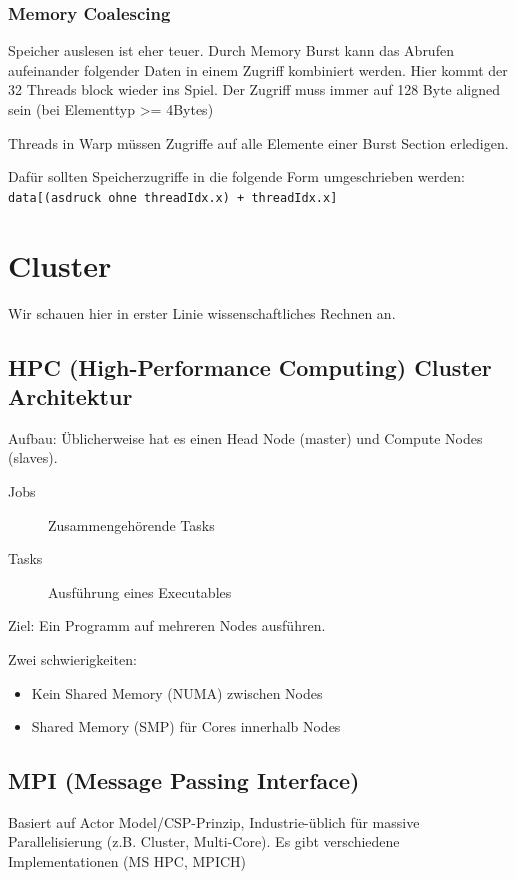 \subsubsection{Memory Coalescing}

Speicher auslesen ist eher teuer. Durch Memory Burst kann das Abrufen aufeinander folgender Daten in einem Zugriff kombiniert werden. Hier kommt der 32 Threads block wieder ins Spiel. Der Zugriff muss immer auf 128 Byte aligned sein (bei Elementtyp >= 4Bytes)

Threads in Warp müssen Zugriffe auf alle Elemente einer Burst Section erledigen.

Dafür sollten Speicherzugriffe in die folgende Form umgeschrieben werden: \lstinline|data[(asdruck ohne threadIdx.x) + threadIdx.x]|



\section{Cluster}

Wir schauen hier in erster Linie wissenschaftliches Rechnen an.

\subsection{HPC (High-Performance Computing) Cluster Architektur}

Aufbau: Üblicherweise hat es einen Head Node (master) und Compute Nodes (slaves).

\begin{description}
	\item[Jobs] Zusammengehörende Tasks
	\item[Tasks] Ausführung eines Executables
\end{description}


Ziel: Ein Programm auf mehreren Nodes ausführen.

Zwei schwierigkeiten:
\begin{itemize}
	\item Kein Shared Memory (NUMA) zwischen Nodes
	\item Shared Memory (SMP) für Cores innerhalb Nodes
\end{itemize}


\subsection{MPI (Message Passing Interface)}

Basiert auf Actor Model/CSP-Prinzip, Industrie-üblich für massive Parallelisierung (z.B. Cluster, Multi-Core). Es gibt verschiedene Implementationen (MS HPC, MPICH)


